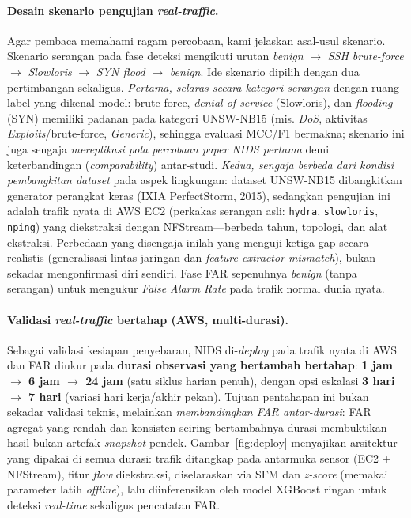 \documentclass[11pt,a4paper]{article}
\begin{document}
\paragraph{Desain skenario pengujian \emph{real-traffic}.} Agar pembaca memahami
ragam percobaan, kami jelaskan asal-usul skenario. Skenario serangan pada fase
deteksi mengikuti urutan \emph{benign} $\rightarrow$ \emph{SSH brute-force}
$\rightarrow$ \emph{Slowloris} $\rightarrow$ \emph{SYN flood} $\rightarrow$
\emph{benign}. Ide skenario dipilih dengan dua pertimbangan sekaligus.
\emph{Pertama, selaras secara kategori serangan} dengan ruang label yang dikenal
model: brute-force, \emph{denial-of-service} (Slowloris), dan \emph{flooding}
(SYN) memiliki padanan pada kategori UNSW-NB15 (mis. \emph{DoS}, aktivitas
\emph{Exploits}/brute-force, \emph{Generic}), sehingga evaluasi MCC/F1 bermakna;
skenario ini juga sengaja \emph{mereplikasi pola percobaan paper NIDS pertama}
demi keterbandingan (\emph{comparability}) antar-studi. \emph{Kedua, sengaja
berbeda dari kondisi pembangkitan dataset} pada aspek lingkungan: dataset
UNSW-NB15 dibangkitkan generator perangkat keras (IXIA PerfectStorm, 2015),
sedangkan pengujian ini adalah trafik nyata di AWS EC2 (perkakas serangan asli:
\texttt{hydra}, \texttt{slowloris}, \texttt{nping}) yang diekstraksi dengan
NFStream---berbeda tahun, topologi, dan alat ekstraksi. Perbedaan yang disengaja
inilah yang menguji ketiga gap secara realistis (generalisasi lintas-jaringan
dan \emph{feature-extractor mismatch}), bukan sekadar mengonfirmasi diri sendiri.
Fase FAR sepenuhnya \emph{benign} (tanpa serangan) untuk mengukur \emph{False
Alarm Rate} pada trafik normal dunia nyata.

\paragraph{Validasi \emph{real-traffic} bertahap (AWS, multi-durasi).} Sebagai
validasi kesiapan penyebaran, NIDS di-\emph{deploy} pada trafik nyata di AWS dan
FAR diukur pada \textbf{durasi observasi yang bertambah bertahap}:
\textbf{1 jam $\rightarrow$ 6 jam $\rightarrow$ 24 jam} (satu siklus harian
penuh), dengan opsi eskalasi \textbf{3 hari $\rightarrow$ 7 hari} (variasi hari
kerja/akhir pekan). Tujuan pentahapan ini bukan sekadar validasi teknis,
melainkan \emph{membandingkan FAR antar-durasi}: FAR agregat yang rendah dan
konsisten seiring bertambahnya durasi membuktikan hasil bukan artefak
\emph{snapshot} pendek. Gambar~\ref{fig:deploy} menyajikan arsitektur yang
dipakai di semua durasi: trafik ditangkap pada antarmuka sensor (EC2 + NFStream),
fitur \emph{flow} diekstraksi, diselaraskan via SFM dan \emph{z-score} (memakai
parameter latih \emph{offline}), lalu diinferensikan oleh model XGBoost ringan
untuk deteksi \emph{real-time} sekaligus pencatatan FAR.
\end{document}
